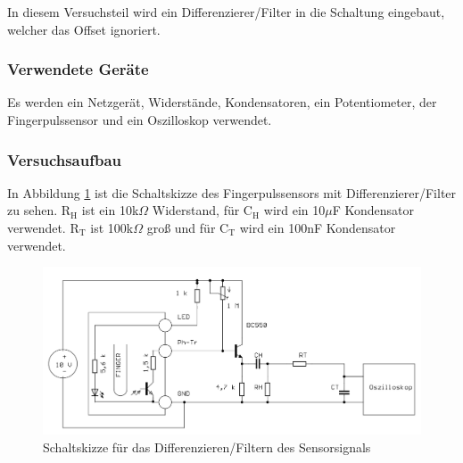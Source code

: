 \documentclass[12pt,a4paper]{article}
\begin{document}
In diesem Versuchsteil wird ein Differenzierer/Filter in die Schaltung eingebaut, welcher das Offset ignoriert.

\subsubsection*{Verwendete Geräte}

Es werden ein Netzgerät, Widerstände, Kondensatoren, ein Potentiometer, der Fingerpulssensor und ein Oszilloskop verwendet.

\subsubsection*{Versuchsaufbau}

In Abbildung \ref{fig:auf_2} ist die Schaltskizze des Fingerpulssensors mit Differenzierer/Filter zu sehen. R$_\text{H}$ ist ein 10k$\Omega$ Widerstand, für C$_\text{H}$ wird ein 10$\mu$F Kondensator verwendet.  R$_\text{T}$ ist 100k$\Omega$ groß und für C$_\text{T}$ wird ein 100nF Kondensator verwendet.

\begin{figure}[H] 
	\centering
	\includegraphics[scale = 0.3]{auf_2.png}
	\caption[Schaltskizze für das Differenzieren/Filtern des Sensorsignals]{Schaltskizze für das Differenzieren/Filtern des Sensorsignals\footnotemark}
	\label{fig:auf_2}
\end{figure}
\end{document}
